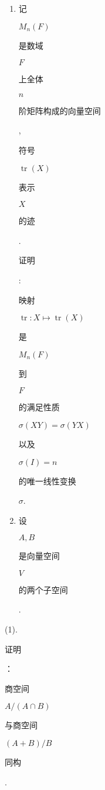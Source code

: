 \documentclass[10pt]{article}
\begin{document}
\begin{enumerate}
  \item \begin{CJK}{UTF8}{mj}记\end{CJK} $M_{n}(F)$ \begin{CJK}{UTF8}{mj}是数域\end{CJK} $F$ \begin{CJK}{UTF8}{mj}上全体\end{CJK} $n$ \begin{CJK}{UTF8}{mj}阶矩阵构成的向量空间\end{CJK}, \begin{CJK}{UTF8}{mj}符号\end{CJK} $\operatorname{tr}(X)$ \begin{CJK}{UTF8}{mj}表示\end{CJK} $X$ \begin{CJK}{UTF8}{mj}的迹\end{CJK}. \begin{CJK}{UTF8}{mj}证明\end{CJK}: \begin{CJK}{UTF8}{mj}映射\end{CJK} $\operatorname{tr}: X \mapsto \operatorname{tr}(X)$ \begin{CJK}{UTF8}{mj}是\end{CJK} $M_{n}(F)$ \begin{CJK}{UTF8}{mj}到\end{CJK} $F$ \begin{CJK}{UTF8}{mj}的满足性质\end{CJK} $\sigma(X Y)=\sigma(Y X)$ \begin{CJK}{UTF8}{mj}以及\end{CJK} $\sigma(I)=n$ \begin{CJK}{UTF8}{mj}的唯一线性变换\end{CJK} $\sigma$.

  \item \begin{CJK}{UTF8}{mj}设\end{CJK} $A, B$ \begin{CJK}{UTF8}{mj}是向量空间\end{CJK} $V$ \begin{CJK}{UTF8}{mj}的两个子空间\end{CJK}.

\end{enumerate}
(1). \begin{CJK}{UTF8}{mj}证明\end{CJK}：\begin{CJK}{UTF8}{mj}商空间\end{CJK} $A /(A \cap B)$ \begin{CJK}{UTF8}{mj}与商空间\end{CJK} $(A+B) / B$ \begin{CJK}{UTF8}{mj}同构\end{CJK}.
\end{document}
